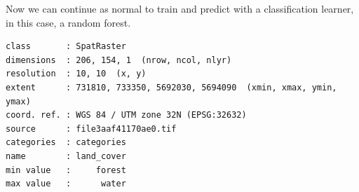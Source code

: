 \begin{Shaded}
\begin{Highlighting}[]
 \NormalTok{)}

\OtherTok{=}\SpecialCharTok{::}\NormalTok{(}\NormalTok{(}\NormalTok{,}
  \NormalTok{, } \NormalTok{),}
   \NormalTok{)}
\OtherTok{=}  \NormalTok{)}

\OtherTok{=}\SpecialCharTok{::}\NormalTok{(}\NormalTok{(}\NormalTok{, }\NormalTok{,}
   \NormalTok{))}
\end{Highlighting}
\end{Shaded}

Now we can continue as normal to train and predict with a classification
learner, in this case, a random forest.

\begin{Shaded}
\begin{Highlighting}[]
\OtherTok{=} \NormalTok{(}\NormalTok{)}\SpecialCharTok{$}
\OtherTok{=} 
   \NormalTok{)}
\end{Highlighting}
\end{Shaded}

\begin{verbatim}
class       : SpatRaster 
dimensions  : 206, 154, 1  (nrow, ncol, nlyr)
resolution  : 10, 10  (x, y)
extent      : 731810, 733350, 5692030, 5694090  (xmin, xmax, ymin, ymax)
coord. ref. : WGS 84 / UTM zone 32N (EPSG:32632) 
source      : file3aaf41170ae0.tif 
categories  : categories 
name        : land_cover 
min value   :     forest 
max value   :      water 
\end{verbatim}

